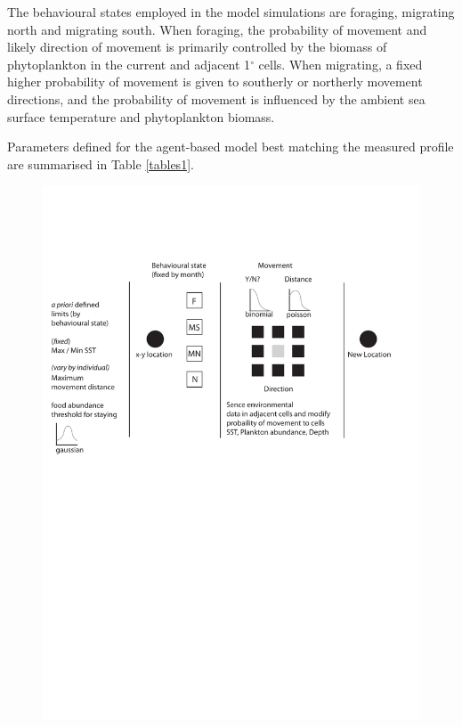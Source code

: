 \documentclass[a4paper,10pt]{article}
\begin{document}
The behavioural states employed in the model simulations are foraging, migrating north and migrating south. 
When foraging, the probability of movement and likely direction of movement is primarily controlled by the biomass of phytoplankton in the current and adjacent 1$^{\circ}$ cells. 
When migrating, a fixed higher probability of movement is given to southerly or northerly movement directions, and the probability of movement is influenced by the ambient sea surface temperature and phytoplankton biomass.
 
Parameters defined for the agent-based model best matching the measured profile are summarised in Table \ref{tables1}.

\newpage

\begin{landscape}

  \vspace{-1cm}
\begin{figure}[!htbp]
  \centering
  \includegraphics[trim = {3cm 0 0 0}, clip]{figures/flow-diagram-model.pdf}

\end{figure}
\end{landscape}
\end{document}
